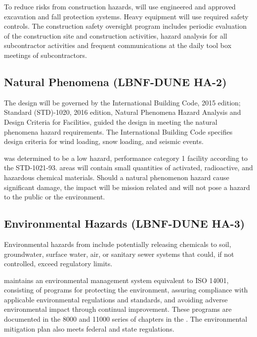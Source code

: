 To reduce risks from construction hazards, \fnal will use engineered
and approved excavation and fall protection systems.  Heavy equipment
will use required safety controls. The \fnal construction safety
oversight program includes periodic evaluation of the construction
site and construction activities, hazard analysis for all
subcontractor activities and frequent  communications at
the daily tool box meetings of subcontractors.

\subsection{Natural Phenomena (LBNF-DUNE HA-2)}

The  design will be governed by the
International Building Code, 2015 edition;  Standard
(STD)-1020, 2016 edition, Natural Phenomena Hazard Analysis and Design
Criteria for  Facilities, guided the design in meeting the
natural phenomena hazard requirements.  The International Building
Code specifies design criteria for wind loading, snow loading, and
seismic events.

 was determined to be a low hazard,
performance category 1 facility according to the 
STD-1021-93.  areas will contain small
quantities of activated, radioactive, and hazardous chemical
materials. Should a natural phenomenon hazard cause significant
damage, the impact will be mission related and will not pose a hazard
to the public or the environment.

\subsection{Environmental Hazards (LBNF-DUNE HA-3)}

Environmental hazards from  include potentially releasing
chemicals to soil, groundwater, surface water, air, or sanitary sewer
systems that could, if not controlled, exceed regulatory limits.

\fnal maintains an environmental management system equivalent to ISO
14001, consisting of programs for protecting the environment, assuring
compliance with applicable environmental regulations and standards,
and avoiding adverse environmental impact through continual
improvement.  These programs are documented in the 8000 and 11000
series of chapters in the .  The environmental mitigation
plan also meets federal and state regulations.


